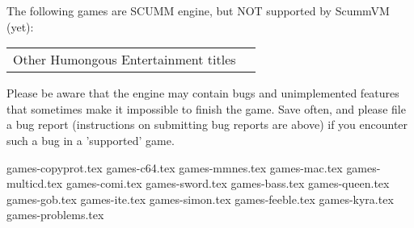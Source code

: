\begin{itemize}
The following games are SCUMM engine, but NOT supported by ScummVM (yet):

  \begin{tabular}{ll}
    Other Humongous Entertainment titles\\
  \end{tabular}

Please be aware that the engine may contain bugs and unimplemented features
that sometimes make it impossible to finish the game. Save often, and please
file a bug report (instructions on submitting bug reports are above) if you
encounter such a bug in a 'supported' game.

\end{itemize}


 {games-copyprot.tex}
 {games-c64.tex}
 {games-mmnes.tex}
 {games-mac.tex}
 {games-multicd.tex}
 {games-comi.tex}
 {games-sword.tex}
 {games-bass.tex}
 {games-queen.tex}
 {games-gob.tex}
 {games-ite.tex}
 {games-simon.tex}
 {games-feeble.tex}
 {games-kyra.tex}
 {games-problems.tex}


